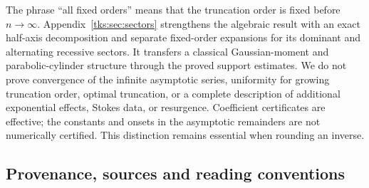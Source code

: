The phrase ``all fixed orders'' means that the truncation order is fixed before $n\to\infty$. Appendix~\ref{tks:sec:sectors} strengthens the algebraic result with an exact half-axis decomposition and separate fixed-order expansions for its dominant and alternating recessive sectors. It transfers a classical Gaussian-moment and parabolic-cylinder structure through the proved support estimates. We do not prove convergence of the infinite asymptotic series, uniformity for growing truncation order, optimal truncation, or a complete description of additional exponential effects, Stokes data, or resurgence. Coefficient certificates are effective; the constants and onsets in the asymptotic remainders are not numerically certified. This distinction remains essential when rounding an inverse.

\subsection{Provenance, sources and reading conventions}\label{tks:sec:provenance}

